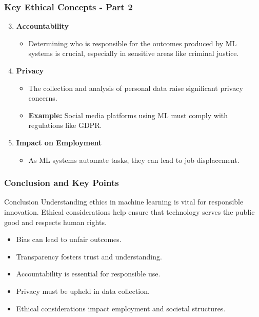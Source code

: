 \documentclass[aspectratio=169]{beamer}
\begin{document}
\begin{frame}[fragile]
    \frametitle{Key Ethical Concepts - Part 2}

    \begin{enumerate}
        \setcounter{enumi}{2}
        \item \textbf{Accountability}
        \begin{itemize}
            \item Determining who is responsible for the outcomes produced by ML systems is crucial, especially in sensitive areas like criminal justice.
        \end{itemize}

        \item \textbf{Privacy}
        \begin{itemize}
            \item The collection and analysis of personal data raise significant privacy concerns.
            \item \textbf{Example:} Social media platforms using ML must comply with regulations like GDPR.
        \end{itemize}

        \item \textbf{Impact on Employment}
        \begin{itemize}
            \item As ML systems automate tasks, they can lead to job displacement.
        \end{itemize}
    \end{enumerate}
\end{frame}

\begin{frame}[fragile]
    \frametitle{Conclusion and Key Points}

    \begin{block}{Conclusion}
        Understanding ethics in machine learning is vital for responsible innovation. Ethical considerations help ensure that technology serves the public good and respects human rights.
    \end{block}

    \begin{itemize}
        \item Bias can lead to unfair outcomes.
        \item Transparency fosters trust and understanding.
        \item Accountability is essential for responsible use.
        \item Privacy must be upheld in data collection.
        \item Ethical considerations impact employment and societal structures.
    \end{itemize}
\end{frame}
\end{document}
